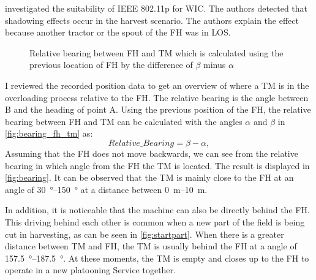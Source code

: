 \documentclass[]{nsm-thesis}
\begin{document}
\textcite{klingler_agriculture_2018} investigated the suitability of IEEE 802.11p for \ac{WIC}. The authors detected that shadowing effects occur in the harvest scenario. The authors explain the effect because another tractor or the spout of the \ac{FH} was in \ac{LOS}.
\begin{figure}%
	\centering
	\caption{Relative bearing between \ac{FH} and \ac{TM} which is calculated using the previous location of \ac{FH} by the difference of $\beta$ minus $\alpha$}%
	\label{fig:bearing_fh_tm}%
\end{figure}
I reviewed the recorded position data to get an overview of where a \ac{TM} is in the overloading process relative to the \ac{FH}. The relative bearing is the angle between B and the heading of point A. Using the previous position of the \ac{FH}, the relative bearing between \ac{FH} and \ac{TM} can be calculated with the angles $\alpha$ and $\beta$ in \autoref{fig:bearing_fh_tm} as:
\begin{equation}\label{eq:RelativeBearing}
	Relative\_Bearing = \beta - \alpha	,
\end{equation}
Assuming that the \ac{FH} does not move backwards, we can see from the relative bearing in which angle from the \ac{FH} the \ac{TM} is located. The result is displayed in \autoref{fig:bearing}. It can be observed that the \ac{TM} is mainly close to the \ac{FH} at an angle of \SIrange{30}{150}{\degree} at a distance between \SIrange{0}{10}{\metre}. 

In addition, it is noticeable that the machine can also be directly behind the \ac{FH}. This driving behind each other is common when a new part of the field is being cut in harvesting, as can be seen in \autoref{fig:startpart}. When there is a greater distance between \ac{TM} and \ac{FH}, the \ac{TM} is usually behind the FH at a angle of \SIrange{157.5}{187.5}{\degree}. At these moments, the \ac{TM} is empty and closes up to the \ac{FH} to operate in a new platooning Service together. 
\end{document}
